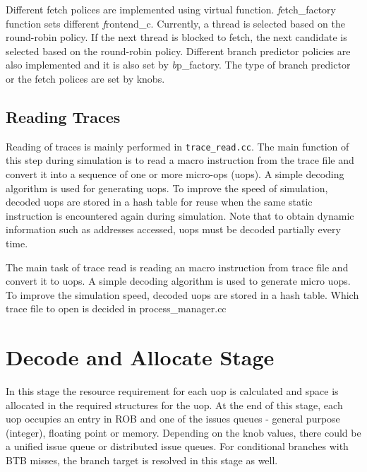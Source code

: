\ignore
		{ Different fetch polices are implemented using virtual
		  function.  {\textit fetch\_factory} function sets different {\textit
		  frontend\_c}.  Currently, a thread is selected based on the
		  round-robin policy. If the next thread is blocked to fetch, the next
		  candidate is selected based on the round-robin policy.  Different
		  branch predictor policies are also implemented and it is also set by
		  {\textit bp\_factory}. The type of branch predictor or the fetch
		  polices are set by knobs.}


\subsection{Reading Traces}

Reading of traces is mainly performed in \Verb+trace_read.cc+. The
main function of this step during simulation is to read a macro
instruction from the trace file and convert it into a sequence of one
or more micro-ops (uops). A simple decoding algorithm is used for
generating uops. To improve the speed of simulation, decoded uops are
stored in a hash table for reuse when the same static instruction is
encountered again during simulation. Note that to obtain dynamic
information such as addresses accessed, uops must be decoded partially
every time.

\ignore 
	  { The main task of trace read is reading an macro instruction from
	  trace file and convert it to uops.  A simple decoding algorithm is used to
	  generate micro uops.  To improve the simulation speed, decoded uops are
	  stored in a hash table.  Which trace file to open is decided in
	  process\_manager.cc }

\section{Decode and  Allocate Stage}

\ignore
	  {
	  }

In this stage the resource requirement for each uop is calculated and space is
allocated in the required structures for the uop. At the end of this stage, each
uop occupies an entry in ROB and one of the issues queues - general purpose
(integer), floating point or memory. Depending on the knob values, there could
be a unified issue queue or distributed issue queues. For conditional branches
with BTB misses, the branch target is resolved in this stage as well.

